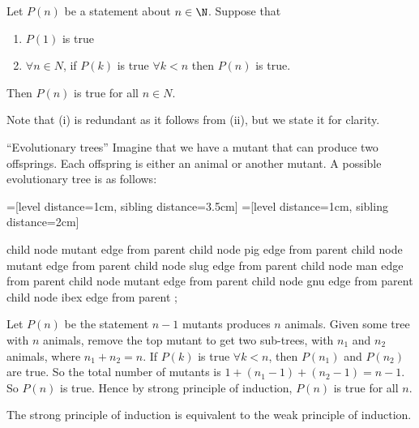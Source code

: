 \documentclass[a4paper]{article}
\begin{document}
\begin{thm}
  Let $P(n)$ be a statement about $n\in \N$. Suppose that
  \begin{enumerate}
    \item $P(1)$ is true
    \item $\forall n\in N$, if $P(k)$ is true $\forall k < n$ then $P(n)$ is true.
  \end{enumerate}
  Then $P(n)$ is true for all $n\in N$.
\end{thm}
Note that (i) is redundant as it follows from (ii), but we state it for clarity.

\begin{eg}
  ``Evolutionary trees'' Imagine that we have a mutant that can produce two offsprings. Each offspring is either an animal or another mutant. A possible evolutionary tree is as follows:

  =[level distance=1cm, sibling distance=3.5cm]
  =[level distance=1cm, sibling distance=2cm]

  \begin{center}
    \begin{tikz}
      child {
        node {mutant} edge from parent
        child {
          node {pig} edge from parent
        }
        child {
          node {mutant} edge from parent
          child {
            node {slug} edge from parent
          }
          child {
            node {man} edge from parent
          }
        }
      }
      child {
        node {mutant} edge from parent
        child {
          node {gnu} edge from parent
        }
        child {
          node {ibex} edge from parent
        }
      };
    \end{tikz}
  \end{center}

  Let $P(n)$ be the statement $n - 1$ mutants produces $n$ animals. Given some tree with $n$ animals, remove the top mutant to get two sub-trees, with $n_1$ and $n_2$ animals, where $n_1 + n_2 = n$. If $P(k)$ is true $\forall k < n$, then $P(n_1)$ and $P(n_2)$ are true. So the total number of mutants is $1 + (n_1 - 1) + (n_2 - 1) = n - 1$. So $P(n)$ is true. Hence by strong principle of induction, $P(n)$ is true for all $n$.
\end{eg}

\begin{thm}
  The strong principle of induction is equivalent to the weak principle of induction.
\end{thm}
\end{document}

